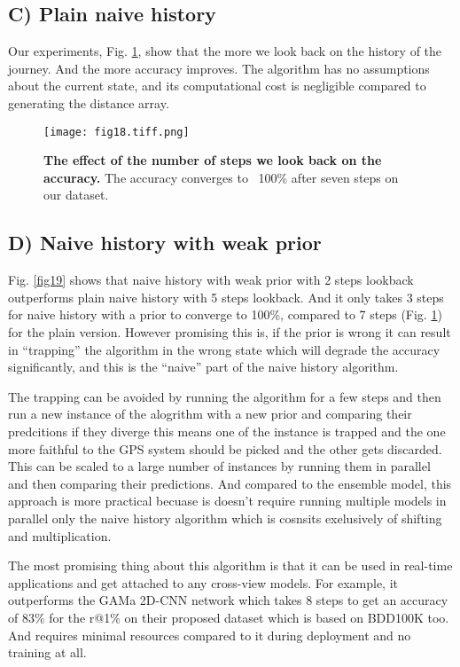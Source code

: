 \documentclass[10pt,letterpaper]{article}
\newif\ifhighlight
\newcommand{\hlb}[1]{\ifhighlight{\hl{#1}}\else{#1}\fi}
\begin{document}
\subsection*{C) Plain naive history}
Our experiments, \hlb{Fig.} \ref{fig18}, show that the more we look back on the history of the journey. And the more accuracy improves. The algorithm has no assumptions about the current state, and its computational cost is negligible compared to generating the distance array.

\begin{figure}[!ht]
  \caption{{\bf The effect of the number of steps we look back on the accuracy.} The accuracy converges to ~100\% after seven steps on our dataset.}
  \texttt{[image: fig18.tiff.png]}
  \label{fig18}
\end{figure}
\FloatBarrier

\subsection*{D) Naive history with weak prior}
\hlb{Fig.} \ref{fig19} shows that naive history with weak prior with 2 steps lookback outperforms plain naive history with 5 steps lookback. And it only takes 3 steps for naive history with a prior to converge to 100\%, compared to 7 steps (\hlb{Fig.} \ref{fig18}) for the plain version. 
However promising this is, if the prior is wrong it can result in “trapping” the algorithm in the wrong state which will degrade the accuracy significantly, and this is the “naive” part of the naive history algorithm.

\hlb{The trapping can be avoided by running the algorithm for a few steps and then run a new instance of the alogrithm with a new prior and comparing their predcitions if they diverge this means one of the instance is trapped and the one more faithful to the GPS system should be picked and the other gets discarded. This can be scaled to a large number of instances by running them in parallel and then comparing their predictions. And compared to the ensemble model, this approach is more practical becuase is doesn't require running multiple models in parallel only the naive history algorithm which is cosnsits exelusively of shifting and multiplication.}

\hlb{The most promising thing about this algorithm is that it can be used in real-time applications and get attached to any cross-view models. For example, it outperforms the GAMa 2D-CNN network} \cite{bib60} \hlb{which takes 8 steps to get an accuracy of 83\% for the r@1\% on their proposed dataset which is based on BDD100K too. And requires minimal resources compared to it during deployment and no training at all.}
\end{document}
